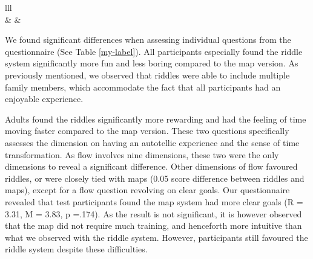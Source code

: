 \begin{table}[h]
\begin{tabular}{lll}
                                                                                                                                                                                                                                         \\ \hline
{}                                                                   &                   &                     \\ \hline
{}                                                                                                                                      
\end{tabular}
\end{table}

We found significant differences when assessing individual questions from the questionnaire (See Table \ref{my-label}). All participants especially found the riddle system significantly more fun and less boring compared to the map version. As previously mentioned, we observed that riddles were able to include multiple family members, which  accommodate the fact that all participants had an enjoyable experience. 

Adults found the riddles significantly more rewarding and had the feeling of time moving faster compared to the map version. These two questions specifically assesses the dimension on having an autotellic experience and the sense of time transformation. As flow involves nine dimensions, these two were the only dimensions to reveal a significant difference. Other dimensions of flow favoured riddles, or were closely tied with maps (0.05 score difference between riddles and maps), except for a flow question revolving on clear goals. Our questionnaire revealed that test participants found the map system had more clear goals (R = 3.31, M = 3.83, p =.174). As the result is not significant, it is however observed that the map did not require much training, and henceforth more intuitive than what we observed with the riddle system. However, participants still favoured the riddle system despite these difficulties. 

